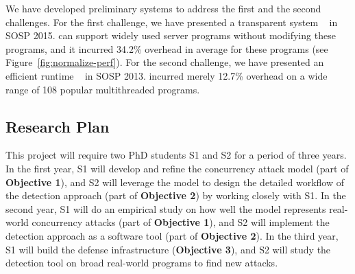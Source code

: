 




 We have developed preliminary systems to 
address the first and the second challenges. For the first challenge, we have 
presented a transparent \smr system \crane~\cite{crane:sosp15} in SOSP 2015. 
\crane can support widely used server programs without modifying these programs, 
and it incurred 34.2\% overhead in average for these programs (see 
Figure~\ref{fig:normalize-perf}). For the second challenge, we have presented an 
efficient \dmt runtime \parrot~\cite{parrot:sosp13} in SOSP 2013. \parrot 
incurred merely 12.7\% overhead on a wide range of 108 popular multithreaded 
programs.

\vspace{-.15in}\subsection{Research Plan} \label{sec:plan}\vspace{-.075in}

This project will require two PhD students S1 and S2 for a period of 
three years. In the first year, S1 will develop and refine the concurrency 
attack model (part of \textbf{Objective 1}), and S2 will leverage the model to 
design the detailed workflow of the detection approach (part of \textbf{Objective 2}) by working 
closely with S1. In the second year, S1 will do an empirical study on how well 
the model represents real-world concurrency attacks (part of \textbf{Objective 
1}), and S2 will implement the detection approach as a software tool (part of 
\textbf{Objective 2}). In the third year, S1 will build the defense 
infrastructure (\textbf{Objective 3}), and S2 will study the detection tool on 
broad real-world programs to find new attacks.


